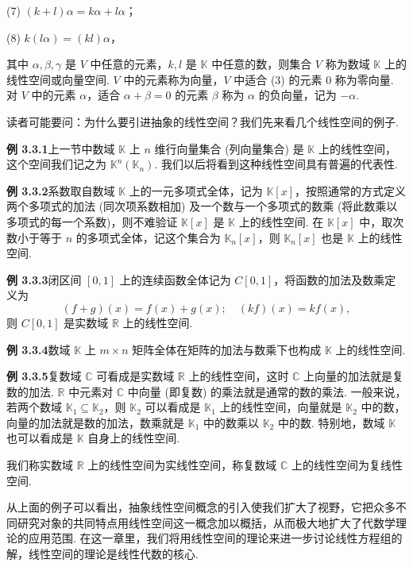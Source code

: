 \documentclass[UTF8,12pt,a4paper,fontset=fandol]{ctexart}
\begin{document}
(7) $(k+l)\alpha=k\alpha+l\alpha$；

(8) $k(l\alpha)=(kl)\alpha$，

其中 $\alpha,\beta,\gamma$ 是 $V$ 中任意的元素，$k,l$ 是 $\mathbb{K}$ 中任意的数，则集合 $V$ 称为数域 $\mathbb{K}$ 上的线性空间或向量空间. $V$ 中的元素称为向量，$V$ 中适合 (3) 的元素 $0$ 称为零向量. 对 $V$ 中的元素 $\alpha$，适合 $\alpha+\beta=0$ 的元素 $\beta$ 称为 $\alpha$ 的负向量，记为 $-\alpha$.

读者可能要问：为什么要引进抽象的线性空间？我们先来看几个线性空间的例子.

\noindent\textbf{例 3.3.1}\quad 上一节中数域 $\mathbb{K}$ 上 $n$ 维行向量集合 (列向量集合) 是 $\mathbb{K}$ 上的线性空间，这个空间我们记之为 $\mathbb{K}^n(\mathbb{K}_n)$. 我们以后将看到这种线性空间具有普遍的代表性.

\noindent\textbf{例 3.3.2}\quad 系数取自数域 $\mathbb{K}$ 上的一元多项式全体，记为 $\mathbb{K}[x]$，按照通常的方式定义两个多项式的加法 (同次项系数相加) 及一个数与一个多项式的数乘 (将此数乘以多项式的每一个系数)，则不难验证 $\mathbb{K}[x]$ 是 $\mathbb{K}$ 上的线性空间. 在 $\mathbb{K}[x]$ 中，取次数小于等于 $n$ 的多项式全体，记这个集合为 $\mathbb{K}_n[x]$，则 $\mathbb{K}_n[x]$ 也是 $\mathbb{K}$ 上的线性空间.

\noindent\textbf{例 3.3.3}\quad 闭区间 $[0,1]$ 上的连续函数全体记为 $C[0,1]$，将函数的加法及数乘定义为
\[
(f+g)(x)=f(x)+g(x);\quad (kf)(x)=kf(x),
\]
则 $C[0,1]$ 是实数域 $\mathbb{R}$ 上的线性空间.

\noindent\textbf{例 3.3.4}\quad 数域 $\mathbb{K}$ 上 $m\times n$ 矩阵全体在矩阵的加法与数乘下也构成 $\mathbb{K}$ 上的线性空间.

\noindent\textbf{例 3.3.5}\quad 复数域 $\mathbb{C}$ 可看成是实数域 $\mathbb{R}$ 上的线性空间，这时 $\mathbb{C}$ 上向量的加法就是复数的加法. $\mathbb{R}$ 中元素对 $\mathbb{C}$ 中向量 (即复数) 的乘法就是通常的数的乘法. 一般来说，若两个数域 $\mathbb{K}_1\subseteq\mathbb{K}_2$，则 $\mathbb{K}_2$ 可以看成是 $\mathbb{K}_1$ 上的线性空间，向量就是 $\mathbb{K}_2$ 中的数，向量的加法就是数的加法，数乘就是 $\mathbb{K}_1$ 中的数乘以 $\mathbb{K}_2$ 中的数. 特别地，数域 $\mathbb{K}$ 也可以看成是 $\mathbb{K}$ 自身上的线性空间.

我们称实数域 $\mathbb{R}$ 上的线性空间为实线性空间，称复数域 $\mathbb{C}$ 上的线性空间为复线性空间.

从上面的例子可以看出，抽象线性空间概念的引入使我们扩大了视野，它把众多不同研究对象的共同特点用线性空间这一概念加以概括，从而极大地扩大了代数学理论的应用范围. 在这一章里，我们将用线性空间的理论来进一步讨论线性方程组的解，线性空间的理论是线性代数的核心.
\end{document}
